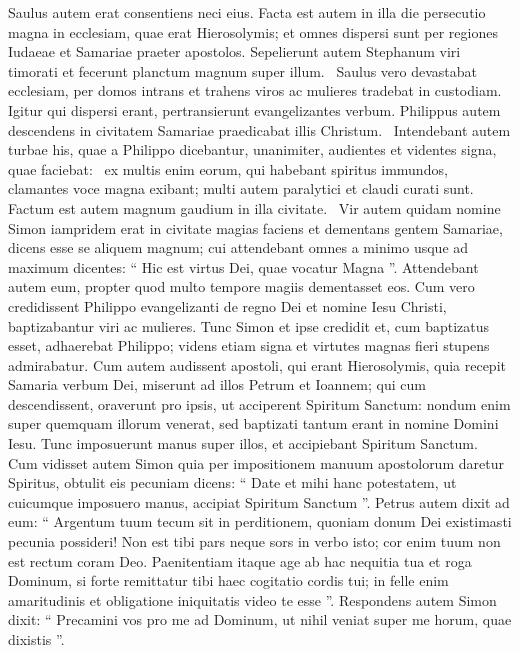 \begin{biblechapter}
\begin{biblechapter}
\begin{biblechapter}
\begin{biblechapter}
\begin{biblechapter}
\begin{biblechapter}
\begin{biblechapter}
\begin{biblechapter}
 \verse Saulus autem erat consentiens neci eius. Facta est autem in illa die persecutio magna in ecclesiam, quae erat Hierosolymis; et omnes dispersi sunt per regiones Iudaeae et Samariae praeter apostolos.
\verse Sepelierunt autem Stephanum viri timorati et fecerunt planctum magnum super illum. 
 \verse Saulus vero devastabat ecclesiam, per domos intrans et trahens viros ac mulieres tradebat in custodiam.
 \verse Igitur qui dispersi erant, pertransierunt evangelizantes verbum.
 \verse Philippus autem descendens in civitatem Samariae praedicabat illis Christum. 
 \verse Intendebant autem turbae his, quae a Philippo dicebantur, unanimiter, audientes et videntes signa, quae faciebat: 
 \verse ex multis enim eorum, qui habebant spiritus immundos, clamantes voce magna exibant; multi autem paralytici et claudi curati sunt. 
 \verse Factum est autem magnum gaudium in illa civitate. 
 \verse Vir autem quidam nomine Simon iampridem erat in civitate magias faciens et dementans gentem Samariae, dicens esse se aliquem magnum; 
\verse cui attendebant omnes a minimo usque ad maximum dicentes: “ Hic est virtus Dei, quae vocatur Magna ”. 
\verse Attendebant autem eum, propter quod multo tempore magiis dementasset eos. 
\verse Cum vero credidissent Philippo evangelizanti de regno Dei et nomine Iesu Christi, baptizabantur viri ac mulieres. 
\verse Tunc Simon et ipse credidit et, cum baptizatus esset, adhaerebat Philippo; videns etiam signa et virtutes magnas fieri stupens admirabatur.
 \verse Cum autem audissent apostoli, qui erant Hierosolymis, quia recepit Samaria verbum Dei, miserunt ad illos Petrum et Ioannem; 
\verse qui cum descendissent, oraverunt pro ipsis, ut acciperent Spiritum Sanctum: 
\verse nondum enim super quemquam illorum venerat, sed baptizati tantum erant in nomine Domini Iesu. 
 \verse Tunc imposuerunt manus super illos, et accipiebant Spiritum Sanctum.
 \verse Cum vidisset autem Simon quia per impositionem manuum apostolorum daretur Spiritus, obtulit eis pecuniam 
\verse dicens: “ Date et mihi hanc potestatem, ut cuicumque imposuero manus, accipiat Spiritum Sanctum ”. 
\verse Petrus autem dixit ad eum: “ Argentum tuum tecum sit in perditionem, quoniam donum Dei existimasti pecunia possideri! 
\verse Non est tibi pars neque sors in verbo isto; cor enim tuum non est rectum coram Deo. 
\verse Paenitentiam itaque age ab hac nequitia tua et roga Dominum, si forte remittatur tibi haec cogitatio cordis tui; 
\verse in felle enim amaritudinis et obligatione iniquitatis video te esse ”. 
\verse Respondens autem Simon dixit: “ Precamini vos pro me ad Dominum, ut nihil veniat super me horum, quae dixistis ”. 

\end{biblechapter}
\end{biblechapter}
\end{biblechapter}
\end{biblechapter}
\end{biblechapter}
\end{biblechapter}
\end{biblechapter}
\end{biblechapter}
